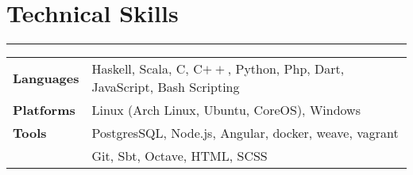 \documentclass[a4paper]{article}
\begin{document}
 \section*{Technical Skills}
 \hrule
 \vspace{3mm}
  \begin{tabular}{@{}m{4.0cm}m{13cm}@{}}
   \textbf{\textrm{Languages}} & 
Haskell, Scala, C, C$++$, Python, Php, Dart, JavaScript, Bash Scripting\\ 
  \textbf{\textrm{Platforms}} &
Linux (Arch Linux, Ubuntu, CoreOS), Windows\\
  
  \textbf{\textrm{Tools}} &
  PostgresSQL, Node.js, Angular, docker, weave, vagrant\\
  & Git, Sbt, Octave, HTML, SCSS\\
  \end{tabular}

\end{document}
